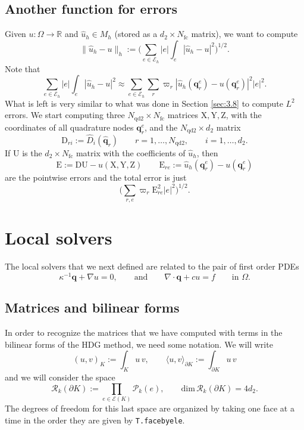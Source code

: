 \documentclass[10pt,english]{article}
\newcommand{\Nndb}{{N_{\mathrm{qd2}}}}
\newcommand{\Nfc}{{N_{\mathrm{fc}}}}
\newcommand{\qq}{\widehat{\mathbf q}}
\begin{document}



\subsection{Another function for errors}

Given $u:\Omega \to \mathbb R$ and $\widehat u_h \in M_h$ (stored as a $d_2\times \Nfc$ matrix), we want to compute
\[
\| \widehat u_h-u\|_h:=\Big( \sum_{e\in \mathcal E_h} |e|\int_e |\widehat u_h-u|^2\Big)^{1/2}.
\]
Note that
\[
\sum_{e\in \mathcal E_h} |e|\int_e |\widehat u_h-u|^2\approx   \sum_{e\in \mathcal E_h}\sum_r \varpi_r |\widehat u_h(\mathbf q_r^e)-u(\mathbf q_r^e)|^2 |e|^2.
\]
What is left is very similar to what was done in Section \ref{sec:3.8} to compute $L^2$ errors. We start computing three $\Nndb\times\Nfc$ matrices $\mathrm X,\mathrm Y,\mathrm Z$, with the coordinates of all quadrature nodes $\mathbf q_r^e$, and the $\Nndb\times d_2$ matrix
\[
\mathrm D_{ri}:=\widehat D_i(\qq_r)\qquad r=1,\ldots,\Nndb, \qquad i=1,\ldots,d_2.
\]
If $\mathrm U$ is the $d_2\times \Nfc$ matrix with the coefficients of $\widehat u_h$, then
\[
\mathrm E:=\mathrm D \mathrm U-u(\mathrm X,\mathrm Y,\mathrm Z)\qquad\mathrm E_{re}:=\widehat u_h(\mathbf q_r^e)-u(\mathbf q_r^e)
\]
are the pointwise errors and the total error is just
\[
\Big( \sum_{r,e} \varpi_r \mathrm E_{re}^2 |e|^2\Big)^{1/2}.
\]




\section{Local solvers}

The local solvers that we next defined are related to the pair of first order PDEs
\[
\kappa^{-1}\boldsymbol q+\nabla u=0, \qquad\mbox{and}\qquad \nabla\cdot \boldsymbol q+c u=f \qquad \mbox{in $\Omega$.}
\]

\subsection{Matrices and bilinear forms}

In order to recognize the matrices that we have computed with terms in the bilinear forms of the HDG method, we need some notation. We will write
\[
(u,v)_K:= \int_K u\, v, \qquad \langle u,v\rangle_{\partial K}:= \int_{\partial K} u\, v
\]
and we will consider the space
\[
\mathcal R_k(\partial K):=\prod_{e\in \mathcal E(K)} \mathcal P_k(e), \qquad \mathrm{dim}\,\mathcal R_k(\partial K)=4 d_2.
\]
The degrees of freedom for this last space are organized by taking one face at a time in the order they are given by {\tt T.facebyele}. 
\end{document}
